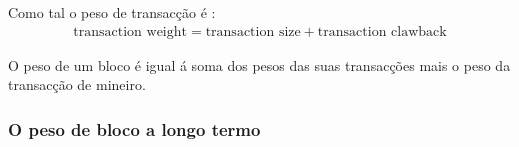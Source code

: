 Como tal o peso de transacção é :\vspace{.175cm}
\begin{align*}
\textrm{transaction\ weight} = \textrm{transaction\ size} + \textrm{transaction\ clawback}
\end{align*}

\fi

O peso de um bloco é igual á soma dos pesos das suas transacções mais o peso da transacção de mineiro. 

\subsubsection*{O peso de bloco a longo termo}

